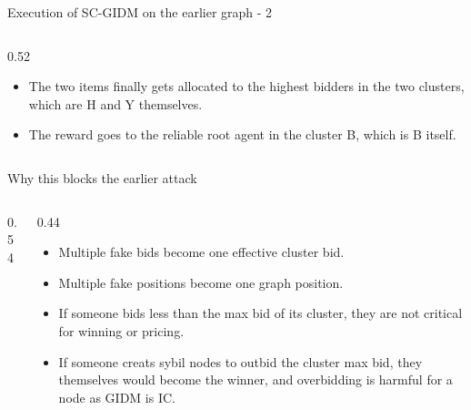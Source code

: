 \documentclass[10pt,aspectratio=169]{beamer}
\newcommand{\greenblock}[2]{\begin{exampleblock}{#1}#2\end{exampleblock}}
\begin{document}
\begin{frame}{Execution of SC-GIDM on the earlier graph - 2 }
\begin{columns}[T,totalwidth=\textwidth]
\begin{column}{0.52\textwidth}
  \begin{itemize}
    \item The two items finally gets allocated to the highest bidders in the two clusters, which are H and Y themselves.
    \item The reward goes to the reliable root agent in the cluster B, which is B itself.
  \end{itemize}
    
\end{column}
\end{columns}
\end{frame}


\begin{frame}{Why this blocks the earlier attack}
\begin{columns}[T,totalwidth=\textwidth]
\begin{column}{0.54\textwidth}
\centering
{}
\end{column}
\begin{column}{0.44\textwidth}
\begin{itemize}
    \item Multiple fake bids become one effective cluster bid.
      \item Multiple fake positions become one graph position.
    \item If someone bids less than the max bid of its cluster, they are not critical for winning or pricing.
    \item If someone creats sybil nodes to outbid the cluster max bid, they themselves would become the winner, and overbidding is harmful for a node as GIDM is IC.
\end{itemize}
\end{column}
\end{columns}
\end{frame}
\end{document}
